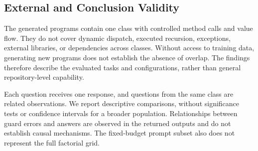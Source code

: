 \subsection{External and Conclusion Validity}

The generated programs contain one class with controlled method calls and value flow. They do not cover dynamic dispatch, executed recursion, exceptions, external libraries, or dependencies across classes. Without access to training data, generating new programs does not establish the absence of overlap. The findings therefore describe the evaluated tasks and configurations, rather than general repository-level capability.

Each question receives one response, and questions from the same class are related observations. We report descriptive comparisons, without significance tests or confidence intervals for a broader population. Relationships between guard errors and answers are observed in the returned outputs and do not establish causal mechanisms. The fixed-budget prompt subset also does not represent the full factorial grid.
